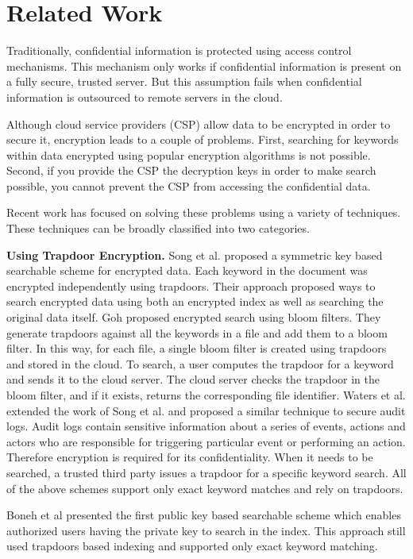 \section{Related Work}
\label{sec:related}

Traditionally, confidential information is protected using access control
mechanisms. This mechanism only works if confidential information is present on
a fully secure, trusted server. But this assumption fails when confidential 
information is outsourced to remote servers in the cloud.

Although cloud service providers (CSP) allow data to be encrypted in order to 
secure it, encryption leads to a couple of problems. First, searching for 
keywords within data encrypted using popular encryption algorithms is not
possible. Second, if you provide the CSP the decryption keys in order to make
search possible, you cannot prevent the CSP from accessing the confidential 
data.

Recent work has focused on solving these problems using a variety of techniques.
These techniques can be broadly classified into two categories.

\textbf{Using Trapdoor Encryption.}
Song et al. \cite{song} proposed a symmetric key based
searchable scheme for encrypted data. Each keyword in the document was encrypted independently
using trapdoors. Their approach proposed ways to search encrypted data using both an
encrypted index as well as searching the original data itself. 
Goh\cite{goh2003secure} proposed encrypted search using bloom filters. They generate trapdoors
against all the keywords in a file and add them to a bloom filter. In this way, for
each file, a single bloom filter is created using trapdoors and stored in
the cloud. To search, a user computes the trapdoor for a keyword and sends it to the cloud
server. The cloud server checks the trapdoor in the bloom filter, and if
it exists, returns the corresponding file identifier. 
Waters et al. \cite{waters2004building} extended the work of Song et al. and proposed a similar
technique to secure audit logs. Audit logs contain sensitive information about a series of
events, actions and actors who are responsible for triggering particular event
or performing an action. Therefore encryption is required for its confidentiality.
When it needs to be searched, a trusted third party issues a trapdoor
for a specific keyword search. All of the above schemes support only
exact keyword matches and rely on trapdoors.

Boneh et al \cite{boneh}
presented the first public key based searchable scheme which enables authorized users having 
the private key to search in the index. This approach still
used trapdoors based indexing and supported only exact keyword matching.


